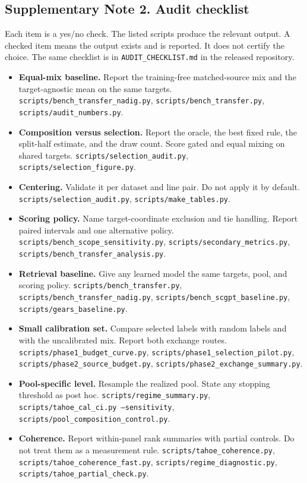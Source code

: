 \documentclass[12pt]{article}
\begin{document}
\begin{singlespace}
\subsection*{Supplementary Note 2. Audit checklist}

Each item is a yes/no check. The listed scripts produce the relevant output. A checked item means the output exists and is reported. It does not certify the choice. The same checklist is in \texttt{AUDIT\_CHECKLIST.md} in the released repository.

\begin{itemize}
\item[$\circ$] \textbf{Equal-mix baseline.} Report the training-free matched-source mix and the target-agnostic mean on the same targets. \texttt{scripts/bench\_transfer\_nadig.py}, \texttt{scripts/bench\_transfer.py}, \texttt{scripts/audit\_numbers.py}.
\item[$\circ$] \textbf{Composition versus selection.} Report the oracle, the best fixed rule, the split-half estimate, and the draw count. Score gated and equal mixing on shared targets. \texttt{scripts/selection\_audit.py}, \texttt{scripts/selection\_figure.py}.
\item[$\circ$] \textbf{Centering.} Validate it per dataset and line pair. Do not apply it by default. \texttt{scripts/selection\_audit.py}, \texttt{scripts/make\_tables.py}.
\item[$\circ$] \textbf{Scoring policy.} Name target-coordinate exclusion and tie handling. Report paired intervals and one alternative policy. \texttt{scripts/bench\_scope\_sensitivity.py}, \texttt{scripts/secondary\_metrics.py}, \texttt{scripts/bench\_transfer\_analysis.py}.
\item[$\circ$] \textbf{Retrieval baseline.} Give any learned model the same targets, pool, and scoring policy. \texttt{scripts/bench\_transfer.py}, \texttt{scripts/bench\_transfer\_nadig.py}, \texttt{scripts/bench\_scgpt\_baseline.py}, \texttt{scripts/gears\_baseline.py}.
\item[$\circ$] \textbf{Small calibration set.} Compare selected labels with random labels and with the uncalibrated mix. Report both exchange routes. \texttt{scripts/phase1\_budget\_curve.py}, \texttt{scripts/phase1\_selection\_pilot.py}, \texttt{scripts/phase2\_source\_budget.py}, \texttt{scripts/phase2\_exchange\_summary.py}.
\item[$\circ$] \textbf{Pool-specific level.} Resample the realized pool. State any stopping threshold as post hoc. \texttt{scripts/regime\_summary.py}, \texttt{scripts/tahoe\_cal\_ci.py --sensitivity}, \texttt{scripts/pool\_composition\_control.py}.
\item[$\circ$] \textbf{Coherence.} Report within-panel rank summaries with partial controls. Do not treat them as a measurement rule. \texttt{scripts/tahoe\_coherence.py}, \texttt{scripts/tahoe\_coherence\_fast.py}, \texttt{scripts/regime\_diagnostic.py}, \texttt{scripts/tahoe\_partial\_check.py}.
\end{itemize}

\end{singlespace}
\end{document}
